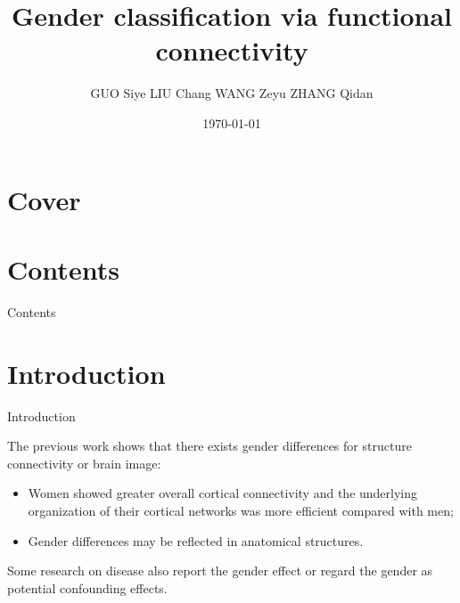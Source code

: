 \documentclass{beamer}
\title{Gender classification via functional connectivity}
\author{GUO Siye \quad LIU Chang \quad WANG Zeyu \quad ZHANG Qidan}
\date{\today}
\begin{document}
\section*{Cover}
\frame{\titlepage}

\section*{Contents}
\begin{frame}{Contents}
    \tableofcontents
\end{frame}

\section{Introduction}

\begin{frame}{Introduction}

    The previous work shows that there exists gender differences for structure connectivity or brain image:

    \begin{itemize}
        \item Women showed greater overall cortical connectivity and the underlying organization of their cortical networks was more efficient compared with men;
        \item Gender differences may be reflected in anatomical structures.
    \end{itemize}

    Some research on disease also report the gender effect or regard the gender as potential confounding effects.

\end{frame}
\end{document}
